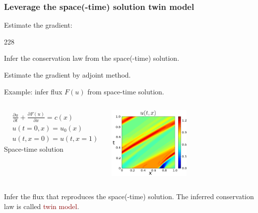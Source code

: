 \documentclass{beamer}
\newcommand{\barrow}{\item[\color{darkred}\ding{228}]}
\begin{document}
\begin{frame}
    \frametitle{Leverage the space(-time) solution \hfill \scriptsize{twin model}}\small
    Estimate the gradient:
    \begin{dinglist}{228}
        \barrow Infer the conservation law from the space(-time) solution.
        \barrow Estimate the gradient by adjoint method.
    \end{dinglist}
    \vspace{.2cm}

    Example: infer flux $F(u)$ from space-time solution.
    \vspace{.1cm}
    \begin{columns}
        \begin{equation*}\begin{split}
            &\frac{\partial u}{\partial t}+ \frac{\partial {F(u)}}{\partial x} = c(x)\\
            &u(t=0,x) = u_0(x)\\
            &u(t,x=0) = u(t, x=1)
        \end{split}\end{equation*}
        \centering
        \scriptsize{
        Space-time solution}\small
        \vspace{-.1cm}
        \begin{center}
            \includegraphics[width=4cm]{imag_1.png}
        \end{center}
    \end{columns}
    \vspace{.15cm}
    Infer the flux that reproduces the space(-time) solution. The inferred
    conservation law is called \textcolor{darkred}{twin model}.
\end{frame}
\end{document}
